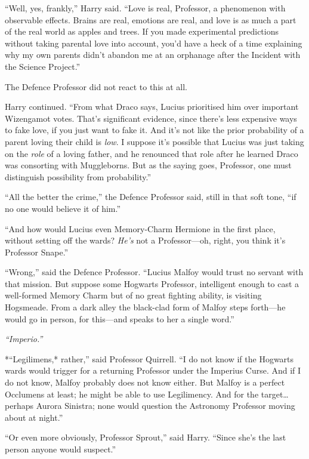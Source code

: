 ``Well, yes, frankly,'' Harry said. ``Love is real, Professor, a
phenomenon with observable effects. Brains are real, emotions are real,
and love is as much a part of the real world as apples and trees. If you
made experimental predictions without taking parental love into account,
you'd have a heck of a time explaining why my own parents didn't abandon
me at an orphanage after the Incident with the Science Project.''

The Defence Professor did not react to this at all.

Harry continued. ``From what Draco says, Lucius prioritised him over
important Wizengamot votes. That's significant evidence, since there's
less expensive ways to fake love, if you just want to fake it. And it's
not like the prior probability of a parent loving their child is
\emph{low}. I suppose it's possible that Lucius was just taking on the
\emph{role} of a loving father, and he renounced that role after he
learned Draco was consorting with Muggleborns. But as the saying goes,
Professor, one must distinguish possibility from probability.''

``All the better the crime,'' the Defence Professor said, still in that
soft tone, ``if no one would believe it of him.''

``And how would Lucius even Memory-Charm Hermione in the first place,
without setting off the wards? \emph{He's} not a Professor---oh, right,
you think it's Professor Snape.''

``Wrong,'' said the Defence Professor. ``Lucius Malfoy would trust no
servant with that mission. But suppose some Hogwarts Professor,
intelligent enough to cast a well-formed Memory Charm but of no great
fighting ability, is visiting Hogsmeade. From a dark alley the
black-clad form of Malfoy steps forth---he would go in person, for
this---and speaks to her a single word.''

\emph{``Imperio.''}

*``Legilimens,* rather,'' said Professor Quirrell. ``I do not know if
the Hogwarts wards would trigger for a returning Professor under the
Imperius Curse. And if I do not know, Malfoy probably does not know
either. But Malfoy is a perfect Occlumens at least; he might be able to
use Legilimency. And for the target\ldots{}perhaps Aurora Sinistra; none
would question the Astronomy Professor moving about at night.''

``Or even more obviously, Professor Sprout,'' said Harry. ``Since she's
the last person anyone would suspect.''

